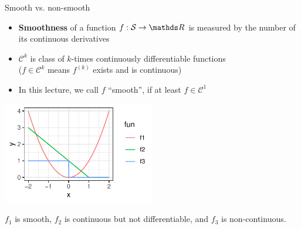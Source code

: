 \documentclass[11pt,compress,t,notes=noshow, xcolor=table]{beamer}
\begin{document}
\begin{vbframe}{Smooth vs. non-smooth}

\begin{itemize}
    \item \textbf{Smoothness} of a function  $f: \mathcal{S} \to \R$ is measured by the number of its continuous derivatives
    \item $\mathcal{C}^k$ is class of $k$-times continuously differentiable functions \\
        ($f\in\mathcal{C}^k$ means $f^{(k)}$ exists and is continuous)
    \item In this lecture, we call $f$ \enquote{smooth}, if at least $f \in \mathcal{C}^1$
\end{itemize}


\begin{center}
\includegraphics[width = 0.5\textwidth]{figure_man/hinge_vs_l2.pdf} \\ 
\begin{footnotesize}
$f_1$ is smooth, $f_2$ is continuous but not differentiable, and $f_3$ is non-continuous. 
\end{footnotesize}
\end{center}


\end{vbframe}
\end{document}
